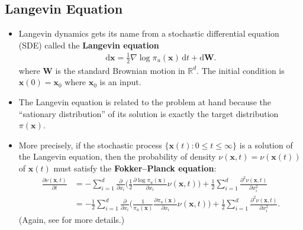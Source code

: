 \documentclass[10pt]{article}
\newcommand{\dee}{\mathrm{d}}
\newcommand{\ve}[1]{\mathbf{#1}}
\newcommand{\Real}{\mathbb{R}}
\begin{document}
\subsection{Langevin Equation}

\begin{itemize}
  \item Langevin dynamics gets its name from a stochastic differential equation (SDE) called the {\bf Langevin equation}
  \begin{align*}
    \dee \ve{x} = \frac{1}{2}\nabla \log \pi_u(\ve{x})\, \dee t + \dee \ve{W}.
  \end{align*}
  where $\ve{W}$ is the standard Brownian motion in $\Real^d$. The initial condition is $\ve{x}(0) = \ve{x}_0$ where $\ve{x}_0$ is an input.

  \item The Langevin equation is related to the problem at hand because the ``sationary distribution'' of its solution is exactly the target distribution $\pi(\ve{x})$. 
  
  \item More precisely, if the stochastic process $\{ \ve{x}(t): 0 \leq t \leq \infty \}$ is a solution of the Langevin equation, then the probability of density $\nu(\ve{x},t) = \nu(\ve{x}(t))$ of $\ve{x}(t)$ must satisfy the {\bf Fokker--Planck equation}:
  \begin{align*}
    \frac{\partial \nu(\ve{x},t)}{\partial t}
    &= - \sum_{i=1}^d \frac{\partial}{\partial x_i} \bigg( \frac{1}{2} \frac{\partial \log \pi_u(\ve{x})}{\partial x_i} \nu(\ve{x},t) \bigg) + \frac{1}{2} \sum_{i=1}^d \frac{\partial^2 \nu(\ve{x},t)}{\partial x_i^2} \\
    &= - \frac{1}{2} \sum_{i=1}^d \frac{\partial}{\partial x_i} \bigg( \frac{1}{\pi_u(\ve{x})} \frac{\partial \pi_u(\ve{x})}{\partial x_i} \nu(\ve{x},t) \bigg) + \frac{1}{2} \sum_{i=1}^d \frac{\partial^2 \nu(\ve{x},t)}{\partial x_i^2}.
  \end{align*}
  (Again, see \cite{Khungurn:2022b} for more details.)


\end{itemize}
\end{document}
